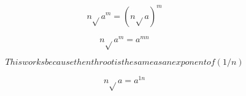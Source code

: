 \[n\sqrt{}a^{m} = (n\sqrt{}a )^{m}\]

\[n\sqrt{}a^{m} = a^{mn}\]

\[This works because the nth root is the same as an exponent of (1/n)\]

\[n\sqrt{}a = a^{1n}\]
